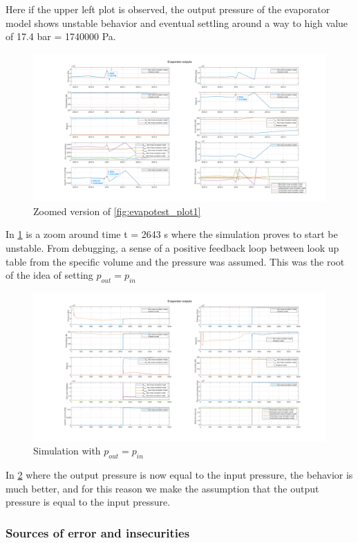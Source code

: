 Here if the upper left plot is observed, the output pressure of the evaporator model shows unstable behavior and eventual settling around a way to high value of 17.4 bar = 1740000 Pa.

\begin{figure}[h]
	\centering
	\includegraphics[width=2.1\textwidth]{Tests/Evapo_test1/plot_unstable_zoomed.png}
	\caption{Zoomed version of \cref{fig:evapotest_plot1}}
	\label{fig:evapotest_plot2}
\end{figure}
In \cref{fig:evapotest_plot2} is a zoom around time t = 2643 s where the simulation proves to start be unstable. From debugging, a sense of a positive feedback loop between look up table from the specific volume and the pressure was assumed. This was the root of the idea of setting $ p_{out} = p_{in} $

\begin{figure}[h]
	\centering
	\includegraphics[width=2.1\textwidth]{Tests/Evapo_test1/plot_stable.png}
	\caption{Simulation with $ p_{out} = p_{in} $}
	\label{fig:evapotest_plot3}
\end{figure}

In \cref{fig:evapotest_plot3} where the output pressure is now equal to the input pressure, the behavior is much better, and for this reason we make the assumption that the output pressure is equal to the input pressure.

\clearpage
\subsubsection*{Sources of error and insecurities}
